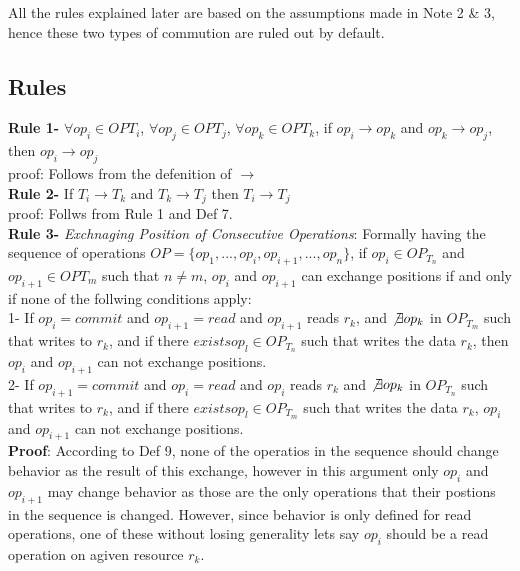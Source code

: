 \documentclass[a4paper, 11pt]{article}
\begin{document}
All the rules explained later are based on the assumptions made in Note 2 \& 3, hence these two types of commution are ruled out by default.\\



\subsection{Rules}

\textbf{Rule 1-} $\forall op_i \in  OP{T_i}$, $\forall op_j \in  OP{T_j}$, $\forall op_k \in  OP{T_k}$, if $op_i \rightarrow op_k$ and  $op_k \rightarrow op_j$, then $op_i \rightarrow op_j$ \\

proof: Follows from the defenition of $\rightarrow$ \\


\textbf{Rule 2-} If $T_i \rightarrow T_k$ and $T_k \rightarrow T_j$ then $T_i \rightarrow T_j$ \\

proof: Follws from Rule 1 and Def 7. \\ 

\textbf{Rule 3-} \emph{Exchnaging Position of Consecutive Operations}: Formally having the sequence of operations $OP = \{op_1,...,op_i,op_{i+1},...,op_n\}$, if $op_i \in OP_{T_n}$ and $op_{i+1} \in OP{T_m}$ such that $ n\neq m$, $op_i$ and $op_{i+1}$ can exchange positions if and only if none of the follwing conditions apply:\\

\hspace{8mm} 1- If $op_i = {commit}$ and $op_{i+1} = {read}$ and $op_{i+1}$ reads $r_k$, and $\not \exists op_k$ in $OP_{T_m}$ such that writes to $r_k$, and if there  $exists op_l \in OP_{T_n}$ such that writes the data $r_k$, then $op_i$ and $op_{i+1}$ can not exchange positions.\\ 

\hspace{8mm} 2- If $op_{i+1} = {commit}$ and $op_{i} = {read}$ and $op_{i}$ reads $r_k$ and $\not \exists op_k$ in $OP_{T_n}$ such that writes to $r_k$, and if there $exists op_l \in OP_{T_m}$ such that writes the data $r_k$, $op_i$ and $op_{i+1}$ can not exchange positions.\\ 


\textbf{Proof}: According to Def 9, none of the operatios in the sequence should change behavior as the result of this exchange, however in this argument only $op_i$ and $op_{i+1}$ may change behavior as those are the only operations that their postions in the sequence is changed. However, since behavior is only defined for read operations, one of these without losing generality lets say $op_i$ should be a read operation on agiven resource $r_k$.\\
\end{document}
